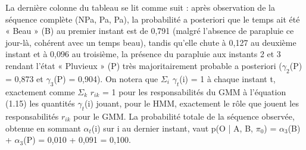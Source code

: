 La dernière colonne du tableau se lit comme suit : après observation de la séquence complète (NPa, Pa, Pa), la probabilité a posteriori que le temps ait été « Beau » (B) au premier instant est de 0,791 (malgré l'absence de parapluie ce jour-là, cohérent avec un temps beau), tandis qu'elle chute à 0,127 au deuxième instant et à 0,096 au troisième, la présence du parapluie aux instants 2 et 3 rendant l'état « Pluvieux » (P) très majoritairement probable a posteriori ($\gamma _{2}$(P) = 0,873 et $\gamma _{3}$(P) = 0,904). On notera que $\Sigma _{i}$ $\gamma _{t}$(i) = 1 à chaque instant t, exactement comme $\Sigma _{k}$ $r_{ik}$ = 1 pour les responsabilités du GMM à l'équation (1.15)  les quantités $\gamma _{t}$(i) jouant, pour le HMM, exactement le rôle que jouent les responsabilités $r_{ik}$ pour le GMM. La probabilité totale de la séquence observée, obtenue en sommant $\alpha _{t}$(i) sur i au dernier instant, vaut p(O | A, B, $\pi _{0}$) = $\alpha _{3}$(B) + $\alpha _{3}$(P) = 0,010 + 0,091 = 0,100.


